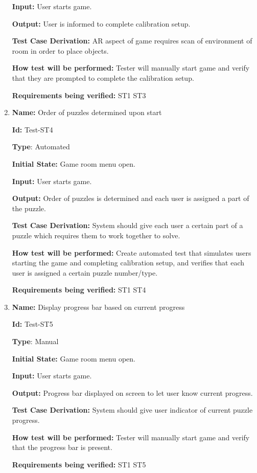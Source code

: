 \documentclass[12pt, titlepage]{article}
\begin{document}
\begin{enumerate}
\textbf{Input:} User starts game.

\textbf{Output:} User is informed to complete calibration setup.

\textbf{Test Case Derivation:} AR aspect of game requires scan of environment of room in order to place objects.

\textbf{How test will be performed:} Tester will manually start game and verify that they are prompted to complete the calibration setup.

\textbf{Requirements being verified: } ST1 ST3

\item{\textbf{Name:} Order of puzzles determined upon start}

\textbf{Id:} Test-ST4

\textbf{Type}: Automated

\textbf{Initial State:} Game room menu open.

\textbf{Input:} User starts game.

\textbf{Output:} Order of puzzles is determined and each user is assigned a part of the puzzle.

\textbf{Test Case Derivation:} System should give each user a certain part of a puzzle which requires them to work together to solve.

\textbf{How test will be performed:} Create automated test that simulates users starting the game and completing calibration setup, and verifies that each user is assigned a certain puzzle number/type.

\textbf{Requirements being verified: } ST1 ST4

\item{\textbf{Name:} Display progress bar based on current progress}

\textbf{Id:} Test-ST5

\textbf{Type}: Manual

\textbf{Initial State:} Game room menu open.

\textbf{Input:} User starts game.

\textbf{Output:} Progress bar displayed on screen to let user know current progress.

\textbf{Test Case Derivation:} System should give user indicator of current puzzle progress.

\textbf{How test will be performed:} Tester will manually start game and verify that the progress bar is present.

\textbf{Requirements being verified: } ST1 ST5


\end{enumerate}
\end{document}
